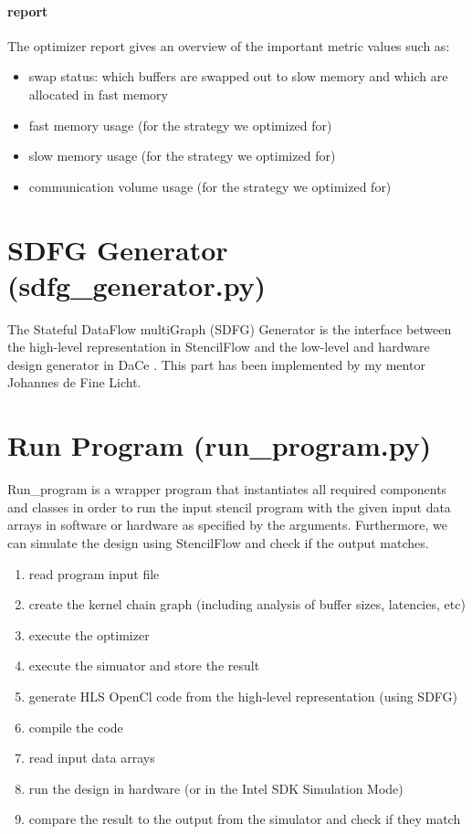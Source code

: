 \paragraph{report}
The optimizer report gives an overview of the important metric values such as:
\begin{itemize}
	\item swap status: which buffers are swapped out to slow memory and which are allocated in fast memory
	\item fast memory usage (for the strategy we optimized for)
	\item slow memory usage (for the strategy we optimized for)
	\item communication volume usage (for the strategy we optimized for)
\end{itemize}







\section{SDFG Generator (sdfg\_generator.py)}
The Stateful DataFlow multiGraph (SDFG) Generator is the interface between the high-level representation in StencilFlow and the low-level and hardware design generator in DaCe \cite{label57}. This part has been implemented by my mentor Johannes de Fine Licht.







\section{Run Program (run\_program.py)}
Run\_program is a wrapper program that instantiates all required components and classes in order to run the input stencil program with the given input data arrays in software or hardware as specified by the arguments. Furthermore, we can simulate the design using StencilFlow and check if the output matches.
\begin{enumerate}
	\item read program input file
	\item create the kernel chain graph (including analysis of buffer sizes, latencies, etc)
	\item execute the optimizer
	\item execute the simuator and store the result
	\item generate HLS OpenCl code from the high-level representation (using SDFG)
	\item compile the code
	\item read input data arrays
	\item run the design in hardware (or in the Intel SDK Simulation Mode)
	\item compare the result to the output from the simulator and check if they match
\end{enumerate}

